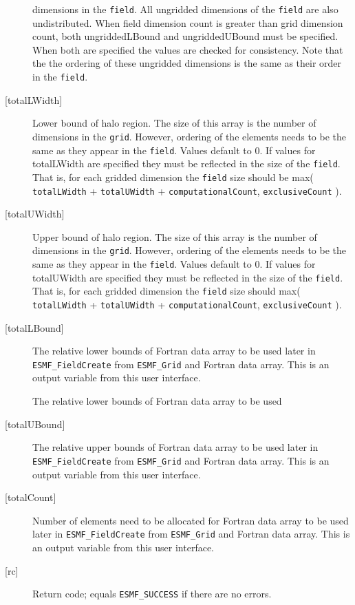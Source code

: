 \begin{description}
         dimensions in the {\tt field}.  All ungridded dimensions of the
         {\tt field} are also undistributed. When field dimension count is
         greater than grid dimension count, both ungriddedLBound and ungriddedUBound
         must be specified. When both are specified the values are checked
         for consistency.  Note that the the ordering of
         these ungridded dimensions is the same as their order in the {\tt field}.
   \item [{[totalLWidth]}]
         Lower bound of halo region.  The size of this array is the number
         of dimensions in the {\tt grid}.  However, ordering of the elements
         needs to be the same as they appear in the {\tt field}.  Values default
         to 0.  If values for totalLWidth are specified they must be reflected in
         the size of the {\tt field}.  That is, for each gridded dimension the
         {\tt field} size should be max( {\tt totalLWidth} + {\tt totalUWidth}
         + {\tt computationalCount}, {\tt exclusiveCount} ).
   \item [{[totalUWidth]}]
         Upper bound of halo region.  The size of this array is the number
         of dimensions in the {\tt grid}.  However, ordering of the elements
         needs to be the same as they appear in the {\tt field}.  Values default
         to 0.  If values for totalUWidth are specified they must be reflected in
         the size of the {\tt field}.  That is, for each gridded dimension the
         {\tt field} size should max( {\tt totalLWidth} + {\tt totalUWidth}
         + {\tt computationalCount}, {\tt exclusiveCount} ).
   \item [{[totalLBound]}]
         \begin{sloppypar}
         The relative lower bounds of Fortran data array to be used
         later in {\tt ESMF\_FieldCreate} from {\tt ESMF\_Grid} and Fortran data array.
         This is an output variable from this user interface.
         \end{sloppypar}
         The relative lower bounds of Fortran data array to be used
   \item [{[totalUBound]}]
         \begin{sloppypar}
         The relative upper bounds of Fortran data array to be used
         later in {\tt ESMF\_FieldCreate} from {\tt ESMF\_Grid} and Fortran data array.
         This is an output variable from this user interface.
         \end{sloppypar}
   \item [{[totalCount]}]
         Number of elements need to be allocated for Fortran data array to be used
         later in {\tt ESMF\_FieldCreate} from {\tt ESMF\_Grid} and Fortran data array.
         This is an output variable from this user interface.
  
   \item[{[rc]}]
       Return code; equals {\tt ESMF\_SUCCESS} if there are no errors.
   \end{description} 
 
